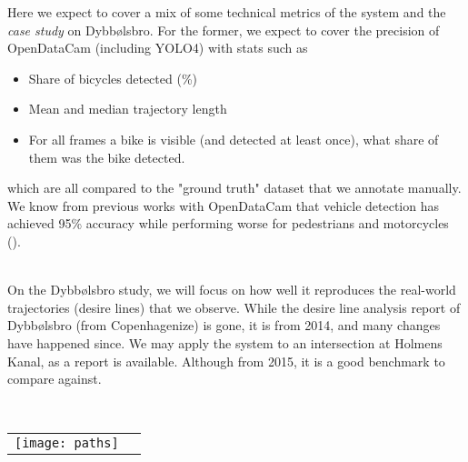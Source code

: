 Here we expect to cover a mix of some technical metrics of the system and the \textit{case study} on Dybbølsbro. 
For the former, we expect to cover the precision of OpenDataCam (including YOLO4) with stats such as

\begin{itemize}
	\item Share of bicycles detected (\%)
	\item Mean and median trajectory length
	\item For all frames a bike is visible (and detected at least once), what share of them was the bike detected.
\end{itemize}

which are all compared to the "ground truth" dataset that we annotate manually. We know from previous works with OpenDataCam
that vehicle detection has achieved 95\% accuracy while performing worse for pedestrians and motorcycles (\cite{BROEKMAN2021100068}).

\ \\
On the Dybbølsbro study, we will focus on how well it reproduces the real-world trajectories (desire lines) that
we observe. While the desire line analysis report of Dybbølsbro (from Copenhagenize) is gone, it is from 2014, and many changes have happened since.
We may apply the system to an intersection at Holmens Kanal, as a report is available. Although from 2015, it is a good benchmark to compare against. 


\raggedbottom
\ \\ 
\noindent
\begin{tabular}{@{}cc}
\texttt{[image: paths]} 
\end{tabular}
